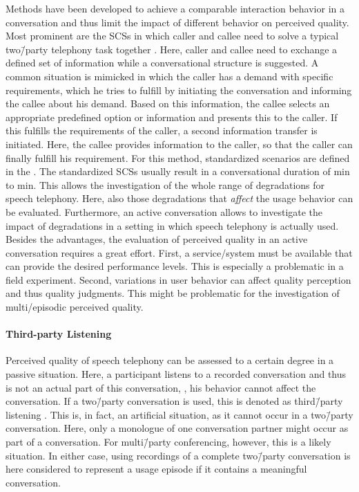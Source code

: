 Methods have been developed to achieve a comparable interaction behavior in a conversation and thus limit the impact of different behavior on perceived quality.
Most prominent are the \acp{SCS} in which caller and callee need to solve a typical two\=/party telephony task together \citep[][p.\,76]{moller_assessment_2000}.
Here, caller and callee need to exchange a defined set of information while a conversational structure is suggested.
A common situation is mimicked in which the caller has a demand with specific requirements, which he tries to fulfill by initiating the conversation and informing the callee about his demand.
Based on this information, the callee selects an appropriate predefined option or information and presents this to the caller.
If this fulfills the requirements of the caller, a second information transfer is initiated.
Here, the callee provides information to the caller, so that the caller can finally fulfill his requirement.
For this method, standardized scenarios are defined in the \citet{itu-t_recommendation_p.805_subjective_2007}.
The standardized \acp{SCS} usually result in a conversational duration of \unit[3]{min} to \unit[7]{min}.
This allows the investigation of the whole range of degradations for speech telephony.
Here, also those degradations that \emph{affect} the usage behavior can be evaluated. %
Furthermore, an active conversation allows to investigate the impact of degradations in a setting in which speech telephony is actually used.
Besides the advantages, the evaluation of perceived quality in an active conversation requires a great effort.
First, a service/system must be available that can provide the desired performance levels.
This is especially a problematic in a field experiment.
Second, variations in user behavior can affect quality perception and thus quality judgments.
This might be problematic for the investigation of multi\-/episodic perceived quality.

\paragraph*{Third-party Listening}
Perceived quality of speech telephony can be assessed  to a certain degree in a passive situation.
Here, a participant listens to a recorded conversation and thus is not an actual part of this conversation, \ie, his behavior cannot affect the conversation.
If a two\=/party conversation is used, this is denoted as third\=/party listening \citep[][p.\,13]{itu-t_recommendation_p.832_subjective_2000}.
This is, in fact, an artificial situation, as it cannot occur in a two\=/party conversation.
Here, only a monologue of one conversation partner might occur as part of a conversation.
For multi\=/party conferencing, however, this is a likely situation.
In either case, using recordings of a complete two\=/party conversation is here considered to represent a usage episode if it contains a meaningful conversation.


